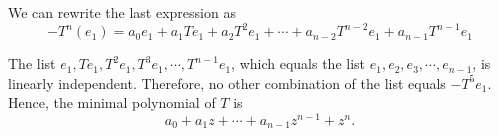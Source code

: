 \begin{xrcs}
\begin{xsol}
    We can rewrite the last expression as
    \begin{equation}
      -T^n (e_1) = a_0 e_1 + a_1 T e_1 + a_2 T^2 e_1 + \cdots + a_{n-2} T ^{n-2} e_1 + a_{n-1} T^{n-1} e_1
    \end{equation}

    The list $e_1, Te_1, T^2e_1, T^3e_1, \cdots, T^{n-1}e_1$, which equals the list $e_1, e_2, e_3, \cdots, e_{n-1}$, is linearly independent. Therefore, no other combination of the list equals $-T^5 e_1$. Hence, the minimal polynomial of $T$ is
    \begin{equation}
      a_0 + a_1 z + \cdots + a_{n-1}z^{n-1} + z^n.
    \end{equation}


  \end{xsol}
\end{xrcs}

